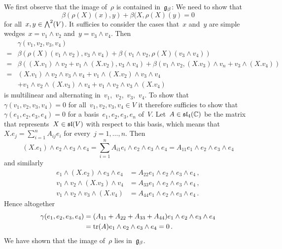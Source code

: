 We first observe that the image of~$\rho$ is contained in~$\mathfrak{g}_\beta$:
We need to show that
\[
  \beta(\rho(X)(x), y) + \beta(X, \rho(X)(y)
  =
  0
\]
for all~$x, y \in \exterior[2]{V}$.
It sufficies to consider the cases that~$x$ and~$y$ are simple wedges~$x = v_1 \wedge v_2$ and~$y = v_3 \wedge v_4$.
Then
\begin{align*}
  {}&
  \gamma(v_1, v_2, v_3, v_4)
  \\
  ={}&
    \beta(\rho(X)(v_1 \wedge v_2), v_3 \wedge v_4)
  + \beta(v_1 \wedge v_2, \rho(X)(v_3 \wedge v_4))
  \\
  ={}&
    \beta((X.v_1) \wedge v_2 + v_1 \wedge (X.v_2), v_3 \wedge v_4)
  + \beta(v_1 \wedge v_2, (X.v_3) \wedge v_n + v_3 \wedge (X.v_4))
  \\
  ={}&
    (X.v_1) \wedge v_2 \wedge v_3 \wedge v_4
  + v_1 \wedge (X.v_2) \wedge v_3 \wedge v_4
  \\
  {}&
  + v_1 \wedge v_2 \wedge (X.v_3) \wedge v_4
  + v_1 \wedge v_2 \wedge v_3 \wedge (X.v_4)
\end{align*}
is multilinear and alternating in~$v_1$,~$v_2$,~$v_3$,~$v_4$.
To show that~$\gamma(v_1, v_2, v_3, v_4) = 0$ for all~$v_1, v_2, v_3, v_4 \in V$ it therefore sufficies to show that~$\gamma(e_1, e_2, e_3, e_4) = 0$ for a basis~$e_1, e_2, e_3, e_n$ of~$V$.
Let~$A \in \mathfrak{sl}_4(\mathbb{C})$ be the matrix that represents~$X \in \mathfrak{sl}(V)$ with respect to this basis, which means that~$X.e_j = \sum_{i=1}^n A_{ij} e_i$ for every~$j = 1, \dotsc, n$.
Then
\[
  (X.e_1) \wedge e_2 \wedge e_3 \wedge e_4
  =
  \sum_{i=1}^n A_{i1} e_i \wedge e_2 \wedge e_3 \wedge e_4
  =
  A_{11} e_1 \wedge e_2 \wedge e_3 \wedge e_4
\]
and similarly
\begin{align*}
  e_1 \wedge (X.e_2) \wedge e_3 \wedge e_4
  &=
  A_{22} e_1 \wedge e_2 \wedge e_3 \wedge e_4 \,,
  \\
  v_1 \wedge v_2 \wedge (X.v_3) \wedge v_4
  &=
  A_{33} e_1 \wedge e_2 \wedge e_3 \wedge e_4 \,,
  \\
  v_1 \wedge v_2 \wedge v_3 \wedge (X.v_4)
  &=
  A_{44} e_1 \wedge e_2 \wedge e_3 \wedge e_4 \,.
\end{align*}
Hence altogether
\begin{align*}
  \gamma(e_1, e_2, e_3, e_4)
  &=
  (A_{11} + A_{22} + A_{33} + A_{44}) e_1 \wedge e_2 \wedge e_3 \wedge e_4
  \\
  &=
  \operatorname{tr}(A) e_1 \wedge e_2 \wedge e_3 \wedge e_4
  =
  0 \,.
\end{align*}
We have shown that the image of~$\rho$ lies in~$\mathfrak{g}_\beta$.

